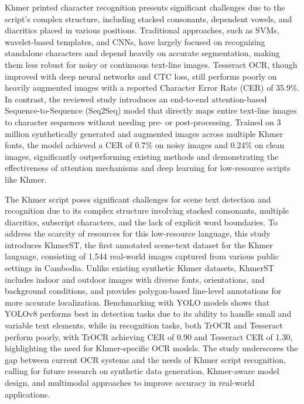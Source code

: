 {\citet{Buoy2022} Khmer printed character recognition presents significant 
challenges due to the script's complex structure, including stacked consonants, 
dependent vowels, and diacritics placed in various positions. Traditional approaches, 
such as SVMs, wavelet-based templates, and CNNs, have largely focused on recognizing standalone 
characters and depend heavily on accurate segmentation, making them less robust for noisy or 
continuous text-line images. Tesseract OCR, though improved with deep neural networks 
and CTC loss, still performs poorly on heavily augmented images with a reported Character 
Error Rate (CER) of 35.9\%. In contrast, the reviewed study introduces an end-to-end 
attention-based Sequence-to-Sequence (Seq2Seq) model that directly maps entire text-line 
images to character sequences without needing pre- or post-processing. Trained on 3 million 
synthetically generated and augmented images across multiple Khmer fonts, the model 
achieved a CER of 0.7\% on noisy images and 0.24\% on clean images, significantly 
outperforming existing methods and demonstrating the effectiveness of attention mechanisms 
and deep learning for low-resource scripts like Khmer.

\citet{nom2024khmerst} The Khmer script poses significant challenges for scene text detection 
and recognition due to its complex structure involving stacked consonants, multiple diacritics, 
subscript characters, and the lack of explicit word boundaries. To address the scarcity of 
resources for this low-resource language, this study introduces KhmerST, the first annotated 
scene-text dataset for the Khmer language, consisting of 1,544 real-world images captured 
from various public settings in Cambodia. Unlike existing synthetic Khmer datasets, 
KhmerST includes indoor and outdoor images with diverse fonts, orientations, and 
background conditions, and provides polygon-based line-level annotations for more accurate 
localization. Benchmarking with YOLO models shows that YOLOv8 performs best in detection 
tasks due to its ability to handle small and variable text elements, while in recognition 
tasks, both TrOCR and Tesseract perform poorly, with TrOCR achieving CER of 0.90 and 
Tesseract CER of 1.30, highlighting the need for Khmer-specific OCR models. The study 
underscores the gap between current OCR systems and the needs of Khmer script recognition, 
calling for future research on synthetic data generation, Khmer-aware model design, 
and multimodal approaches to improve accuracy in real-world applications.

}
